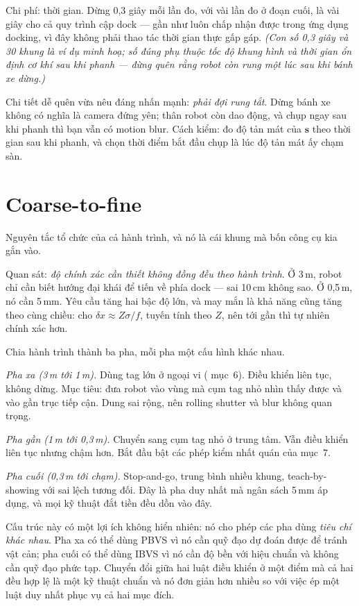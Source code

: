 \documentclass[../../marker.tex]{subfiles}
\begin{document}
Chi phí: thời gian. Dừng 0,3 giây mỗi lần đo, với vài lần đo ở đoạn cuối, là vài giây cho cả quy trình cập dock --- gần như luôn chấp nhận được trong ứng dụng docking, vì đây không phải thao tác thời gian thực gấp gáp. \emph{(Con số 0,3 giây và 30 khung là ví dụ minh hoạ; số đúng phụ thuộc tốc độ khung hình và thời gian ổn định cơ khí sau khi phanh --- đừng quên rằng robot còn rung một lúc sau khi bánh xe dừng.)}

Chi tiết dễ quên vừa nêu đáng nhấn mạnh: \emph{phải đợi rung tắt}. Dừng bánh xe không có nghĩa là camera đứng yên; thân robot còn dao động, và chụp ngay sau khi phanh thì bạn vẫn có motion blur. Cách kiểm: đo độ tản mát của \(\mathbf{s}\) theo thời gian sau khi phanh, và chọn thời điểm bắt đầu chụp là lúc độ tản mát ấy chạm sàn.

\section{Coarse-to-fine}

Nguyên tắc tổ chức của cả hành trình, và nó là cái khung mà bốn công cụ kia gắn vào.

Quan sát: \emph{độ chính xác cần thiết không đồng đều theo hành trình}. Ở 3\,m, robot chỉ cần biết hướng đại khái để tiến về phía dock --- sai 10\,cm không sao. Ở 0,5\,m, nó cần 5\,mm. Yêu cầu tăng hai bậc độ lớn, và may mắn là khả năng cũng tăng theo cùng chiều:  cho \(\delta x \approx Z\sigma/f\), tuyến tính theo \(Z\), nên tới gần thì tự nhiên chính xác hơn.

Chia hành trình thành ba pha, mỗi pha một cấu hình khác nhau.

\emph{Pha xa (3\,m tới 1\,m).} Dùng tag lớn ở ngoại vi ( mục~6). Điều khiển liên tục, không dừng. Mục tiêu: đưa robot vào vùng mà cụm tag nhỏ nhìn thấy được và vào gần trục tiếp cận. Dung sai rộng, nên rolling shutter và blur không quan trọng.

\emph{Pha gần (1\,m tới 0,3\,m).} Chuyển sang cụm tag nhỏ ở trung tâm. Vẫn điều khiển liên tục nhưng chậm hơn. Bắt đầu bật các phép kiểm nhất quán của  mục~7.

\emph{Pha cuối (0,3\,m tới chạm).} Stop-and-go, trung bình nhiều khung, teach-by-showing với sai lệch tương đối. Đây là pha duy nhất mà ngân sách 5\,mm áp dụng, và mọi kỹ thuật đắt tiền đều dồn vào đây.

Cấu trúc này có một lợi ích không hiển nhiên: nó cho phép các pha dùng \emph{tiêu chí khác nhau}. Pha xa có thể dùng PBVS vì nó cần quỹ đạo dự đoán được để tránh vật cản; pha cuối có thể dùng IBVS vì nó cần độ bền với hiệu chuẩn và không cần quỹ đạo phức tạp. Chuyển đổi giữa hai luật điều khiển ở một điểm mà cả hai đều hợp lệ là một kỹ thuật chuẩn và nó đơn giản hơn nhiều so với việc ép một luật duy nhất phục vụ cả hai mục đích.
\end{document}
